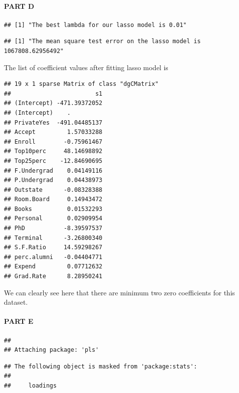 \documentclass[
]{article}
\begin{document}
\hypertarget{part-d-2}{%
\paragraph{PART D}\label{part-d-2}}

\begin{verbatim}
## [1] "The best lambda for our lasso model is 0.01"
\end{verbatim}

\begin{verbatim}
## [1] "The mean square test error on the lasso model is 1067808.62956492"
\end{verbatim}

The list of coefficient values after fitting lasso model is

\begin{verbatim}
## 19 x 1 sparse Matrix of class "dgCMatrix"
##                        s1
## (Intercept) -471.39372052
## (Intercept)    .         
## PrivateYes  -491.04485137
## Accept         1.57033288
## Enroll        -0.75961467
## Top10perc     48.14698892
## Top25perc    -12.84690695
## F.Undergrad    0.04149116
## P.Undergrad    0.04438973
## Outstate      -0.08328388
## Room.Board     0.14943472
## Books          0.01532293
## Personal       0.02909954
## PhD           -8.39597537
## Terminal      -3.26800340
## S.F.Ratio     14.59298267
## perc.alumni   -0.04404771
## Expend         0.07712632
## Grad.Rate      8.28950241
\end{verbatim}

We can clearly see here that there are minimum two zero coefficients for
this dataset.

\hypertarget{part-e-1}{%
\paragraph{PART E}\label{part-e-1}}

\begin{verbatim}
## 
## Attaching package: 'pls'
\end{verbatim}

\begin{verbatim}
## The following object is masked from 'package:stats':
## 
##     loadings
\end{verbatim}
\end{document}
